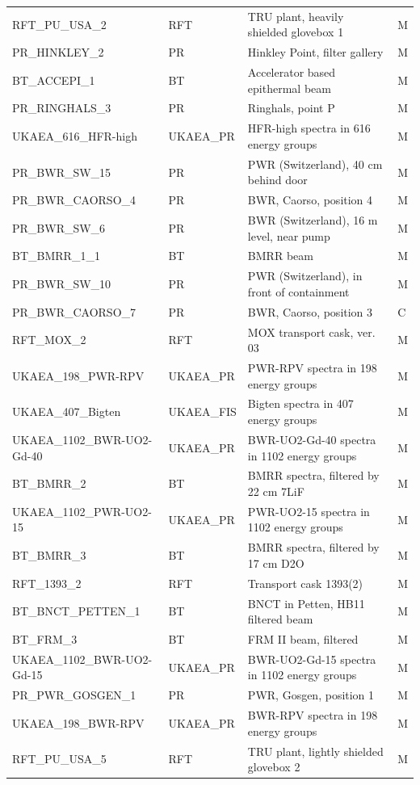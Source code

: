 \documentclass[a4paper, 12pt]{article}
\begin{document}
\begin{appendices}
\begin{longtable}{llll}
RFT\_PU\_USA\_2 & RFT & TRU plant, heavily shielded glovebox 1  & M\\
PR\_HINKLEY\_2 & PR & Hinkley Point, filter gallery  & M\\
BT\_ACCEPI\_1 & BT & Accelerator based epithermal beam  & M\\
PR\_RINGHALS\_3 & PR & Ringhals, point P  & M\\
UKAEA\_616\_HFR-high & UKAEA\_PR & HFR-high spectra in 616 energy groups & M\\
PR\_BWR\_SW\_15 & PR & PWR (Switzerland), 40 cm behind door  & M\\
PR\_BWR\_CAORSO\_4 & PR & BWR, Caorso, position 4  & M\\
PR\_BWR\_SW\_6 & PR & BWR (Switzerland), 16 m level, near pump  & M\\
BT\_BMRR\_1\_1 & BT & BMRR beam  & M\\
PR\_BWR\_SW\_10 & PR & PWR (Switzerland), in front of containment  & M\\
PR\_BWR\_CAORSO\_7 & PR & BWR, Caorso, position 3  & C\\
RFT\_MOX\_2 & RFT & MOX transport cask, ver. 03  & M\\
UKAEA\_198\_PWR-RPV & UKAEA\_PR & PWR-RPV spectra in 198 energy groups & M\\
UKAEA\_407\_Bigten & UKAEA\_FIS & Bigten spectra in 407 energy groups & M\\
UKAEA\_1102\_BWR-UO2-Gd-40 & UKAEA\_PR & BWR-UO2-Gd-40 spectra in 1102 energy groups & M\\
BT\_BMRR\_2 & BT & BMRR spectra, filtered by 22 cm 7LiF  & M\\
UKAEA\_1102\_PWR-UO2-15 & UKAEA\_PR & PWR-UO2-15 spectra in 1102 energy groups & M\\
BT\_BMRR\_3 & BT & BMRR spectra, filtered by 17 cm D2O  & M\\
RFT\_1393\_2 & RFT & Transport cask 1393(2)  & M\\
BT\_BNCT\_PETTEN\_1 & BT & BNCT in Petten, HB11 filtered beam  & M\\
BT\_FRM\_3 & BT & FRM II beam, filtered  & M\\
UKAEA\_1102\_BWR-UO2-Gd-15 & UKAEA\_PR & BWR-UO2-Gd-15 spectra in 1102 energy groups & M\\
PR\_PWR\_GOSGEN\_1 & PR & PWR, Gosgen, position 1  & M\\
UKAEA\_198\_BWR-RPV & UKAEA\_PR & BWR-RPV spectra in 198 energy groups & M\\
RFT\_PU\_USA\_5 & RFT & TRU plant, lightly shielded glovebox 2  & M\\

\end{longtable}
\end{appendices}
\end{document}
